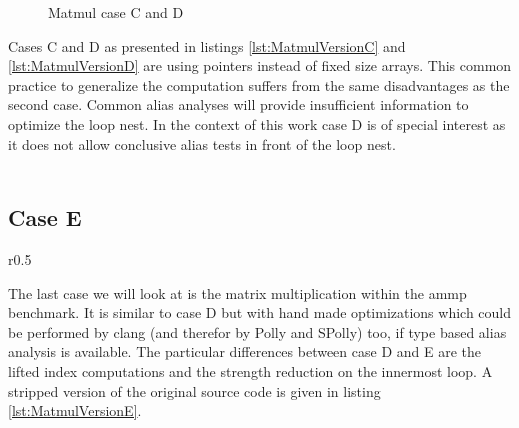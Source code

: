 \begin{figure}[htpb]
  \centering
  \hfill
  \caption{Matmul case C and D}
   \label{lst:MatmulVersionCD}
\end{figure}

Cases C and D as presented in listings \ref{lst:MatmulVersionC} and 
\ref{lst:MatmulVersionD} are using pointers instead of fixed size arrays. 
This common practice to generalize the computation suffers from the same 
disadvantages as the second case. Common alias analyses will provide insufficient
information to optimize the loop nest. In the context of this work case D is 
of special interest as it does not allow conclusive alias tests in front of the
loop nest. \\ ~\\

\subsection*{Case E}
\begin{wrapfigure}[]{r}{0.5\textwidth}
    \hfill
    \hfill
  \begin{minipage}[c]{0.4\textwidth}
    \vspace*{-7mm}
    
    \end{minipage}
    \hfill
    \hfill
    \caption{Matmul case E, extracted from the ammp benchmark in the SPEC 2000 benchmark suite}
    \label{lst:MatmulVersionE}
\end{wrapfigure}
The last case we will look at is the matrix multiplication within the ammp 
benchmark. It is similar to case D but with hand made optimizations which could
be performed by clang (and therefor by Polly and SPolly) too, if type based alias
analysis is available. The particular differences between case D and
E are the lifted index computations and the strength reduction on the innermost
loop.  A stripped version of the original source code is given in 
listing \ref{lst:MatmulVersionE}. 


